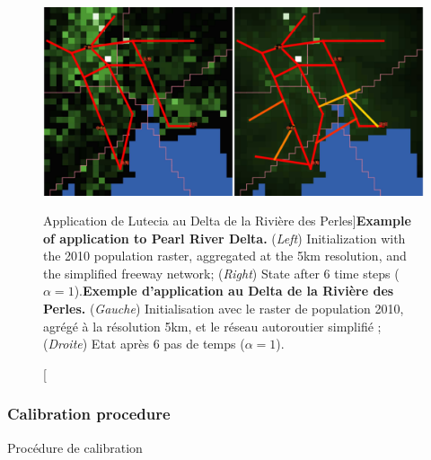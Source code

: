 %


\begin{figure}
\includegraphics[width=\linewidth]{Figures/Final/7-3-3-fig-lutecia-ex-prd.jpg}
\caption[Application of Lutecia to Pearl River Delta][Application de Lutecia au Delta de la Rivière des Perles]{\textbf{Example of application to Pearl River Delta.} (\textit{Left}) Initialization with the 2010 population raster, aggregated at the 5km resolution, and the simplified freeway network; (\textit{Right}) State after 6 time steps ($\alpha = 1$).\label{fig:lutecia:ex-prd}}{\textbf{Exemple d'application au Delta de la Rivière des Perles.} (\textit{Gauche}) Initialisation avec le raster de population 2010, agrégé à la résolution 5km, et le réseau autoroutier simplifié ; (\textit{Droite}) Etat après 6 pas de temps ($\alpha = 1$).\label{fig:lutecia:ex-prd}}
\end{figure}





\subsubsection{Calibration procedure}{Procédure de calibration}


